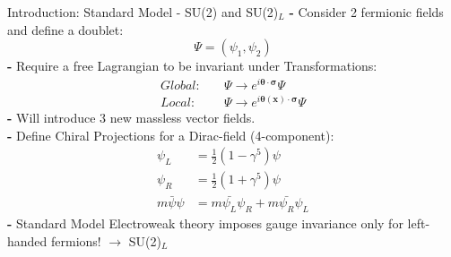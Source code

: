 \documentclass[pdf, 9pt]{beamer}
\begin{document}
  \begin{frame}{Introduction: Standard Model - SU(2) and SU(2)$_L$}
    \textbf{-} Consider 2 fermionic fields and define a doublet:\\\vspace{-0.2cm}
    \begin{equation}
      \Psi = (\psi_1, \psi_2)
    \end{equation}
    \textbf{-} Require a free Lagrangian to be invariant under Transformations:\\\vspace{-0.3cm}
    \begin{subequations}\label{eq:higgs_introduction_gaugesu2}
    \begin{align}
      Global:&\quad \Psi \rightarrow e^{i\boldsymbol{\theta} \cdot \boldsymbol{\sigma}}\Psi\\
      Local:&\quad \Psi \rightarrow e^{i\boldsymbol{\theta(x)} \cdot \boldsymbol\sigma}\Psi\label{eq:higgs_introduction_localgaugesu2}
    \end{align}
    \end{subequations}
    \textbf{-} Will introduce 3 new massless vector fields.\\
    \textbf{-} Define Chiral Projections for a Dirac-field (4-component):\\\vspace{-0.7cm}
    \begin{subequations}\label{eq:higgs_introduction_chiralprojections}
    \begin{align}
      \psi_L& = \frac{1}{2}(1 - \gamma^{5})\psi\\
      \psi_R& = \frac{1}{2}(1 + \gamma^{5})\psi\\
      m\bar{\psi}\psi& = m \bar{\psi_L}\psi_R + m \bar{\psi_R}\psi_L
    \end{align}
    \end{subequations}
    \textbf{-} \alert{Standard Model Electroweak theory imposes gauge invariance only for left-handed fermions! $\rightarrow$ SU(2)$_L$}
  \end{frame}
\end{document}
